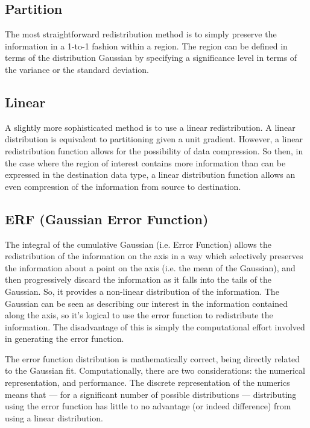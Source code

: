 \subsection{Partition}\label{sec:Partition}

The most straightforward redistribution method is to simply preserve the information in a 1-to-1 fashion within a region. The region can be defined in terms of the distribution Gaussian by specifying a significance level in terms of the variance or the standard deviation.

\subsection{Linear}\label{sec:Linear}

A slightly more sophisticated method is to use a linear redistribution. A linear distribution is equivalent to partitioning given a unit gradient. However, a linear redistribution function allows for the possibility of data compression. So then, in the case where the region of interest contains more information than can be expressed in the destination data type, a linear distribution function allows an even compression of the information from source to destination. ~\cite{Lee2002}

\subsection{ERF (Gaussian Error Function)}\label{sec:ERF}

The integral of the cumulative Gaussian (i.e. Error Function) allows the redistribution of the information on the axis in a way which selectively preserves the information about a point on the axis (i.e. the mean of the Gaussian), and then progressively discard the information as it falls into the tails of the Gaussian. So, it provides a non-linear distribution of the information. The Gaussian can be seen as describing our interest in the information contained along the axis, so it's logical to use the error function to redistribute the information. The disadvantage of this is simply the computational effort involved in generating the error function.

The error function distribution is mathematically correct, being directly related to the Gaussian fit. Computationally, there are two considerations: the numerical representation, and performance. The discrete representation of the numerics means that --- for a significant number of possible distributions --- distributing using the error function has little to no advantage (or indeed difference) from using a linear distribution.

